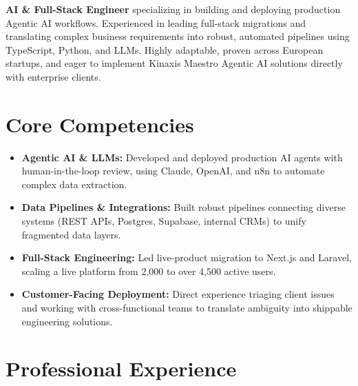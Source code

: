 \documentclass[11pt,a4paper,sans]{moderncv}
\begin{document}
\makecvtitle

\vspace{-1.5em}
\textbf{AI \& Full-Stack Engineer} specializing in building and deploying production Agentic AI workflows. Experienced in leading full-stack migrations and translating complex business requirements into robust, automated pipelines using TypeScript, Python, and LLMs. Highly adaptable, proven across European startups, and eager to implement Kinaxis Maestro Agentic AI solutions directly with enterprise clients.

\vspace{0.5em}
\section{Core Competencies}
\vspace{1pt}
\begin{itemize}
\item \textbf{Agentic AI \& LLMs:} Developed and deployed production AI agents with human-in-the-loop review, using Claude, OpenAI, and n8n to automate complex data extraction.
\item \textbf{Data Pipelines \& Integrations:} Built robust pipelines connecting diverse systems (REST APIs, Postgres, Supabase, internal CRMs) to unify fragmented data layers.
\item \textbf{Full-Stack Engineering:} Led live-product migration to Next.js and Laravel, scaling a live platform from 2,000 to over 4,500 active users.
\item \textbf{Customer-Facing Deployment:} Direct experience triaging client issues and working with cross-functional teams to translate ambiguity into shippable engineering solutions.
\end{itemize}

\vspace{0.5em}
\section{Professional Experience}
\vspace{1pt}
\end{document}
